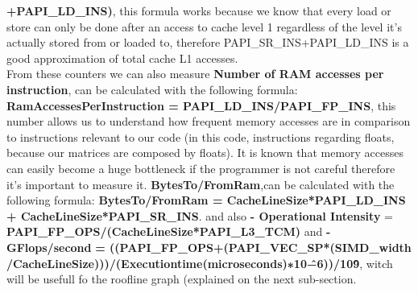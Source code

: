 \documentclass[journal]{IEEEtran}
\begin{document}
\textbf{+PAPI\_LD\_INS)}, this formula works because we know that every load or store can only be done after an access to cache level 1 regardless of the level it's actually stored from or loaded to, therefore PAPI\_SR\_INS+PAPI\_LD\_INS is a good approximation of total cache L1 accesses.\\ From these counters we can also measure \textbf{Number of RAM accesses per instruction}, can be calculated with the following formula: \textbf{RamAccessesPerInstruction = PAPI\_LD\_INS/PAPI\_FP\_INS}, this number allows us to understand how frequent memory accesses are in comparison to instructions relevant to our code (in this code, instructions regarding floats, because our matrices are composed by floats). It is known that memory accesses can easily become a huge bottleneck if the programmer is not careful therefore it's important to measure it. \textbf{BytesTo/FromRam},can be calculated with the following formula: \textbf{BytesTo/FromRam = CacheLineSize*PAPI\_LD\_INS + CacheLineSize*PAPI\_SR\_INS}. and also \textbf{- Operational Intensity} = \textbf{PAPI\_FP\_OPS/(CacheLineSize*PAPI\_L3\_TCM)} and \textbf{- GFlops/second} \textbf{= ((PAPI\_FP\_OPS+(PAPI\_VEC\_SP*(SIMD\_width /CacheLineSize)))/(Executiontime(microseconds)∗10\^−6))/10\^9}, witch will be usefull fo the roofline graph (explained on the next sub-section.
\end{document}
